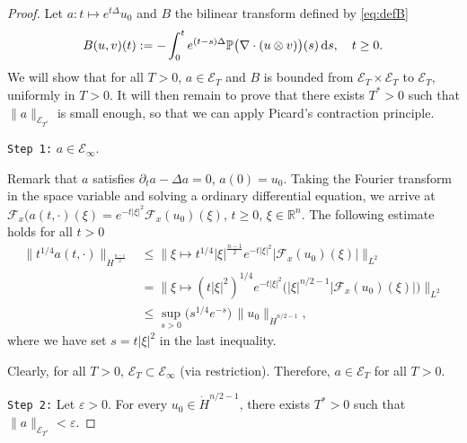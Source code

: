 \documentclass[a4paper, 12pt]{article}
\theoremstyle{plain}
\theoremstyle{definition}
\theoremstyle{remark}
\numberwithin{equation}{section}
\begin{document}
\begin{proof}
Let $a:t\mapsto e^{t\Delta}u_0$ and $B$ the bilinear transform defined by \eqref{eq:defB}
\[
B(u,v)(t):=-\int_0^t e^{(t-s)\Delta}{\mathbb{P}}\bigl(\nabla\cdot(u\otimes v)\bigr)(s)\,{\rm d}s,
\quad t\ge 0.
\]
We will show that for all $T>0$, $a\in {\mathscr{E}}_{T}$ and $B$ is bounded from
${\mathscr{E}}_{T}\times{\mathscr{E}}_{T}$ to ${\mathscr{E}}_{T}$, uniformly in $T>0$. 
It will then remain to prove that there exists $T^*>0$ such that $\|a\|_{{\mathscr{E}}_{T^*}}$
is small enough, so that we can apply Picard's contraction principle.

\medskip

\noindent
{\tt Step 1:} $a\in {\mathscr{E}}_{\infty}$. 

Remark that $a$ satisfies $\partial_t a-\Delta a=0$,
$a(0)=u_0$. Taking the Fourier transform in the space variable and solving a ordinary differential
equation, we arrive at ${\mathscr{F}}_x(a(t,\cdot)(\xi)=e^{-t|\xi|^2}{\mathscr{F}}_x(u_0)(\xi)$, $t\ge 0$, $\xi\in{\mathbb{R}}^n$. 
The following estimate holds for all $t>0$
%
\begin{align}
\label{eq:est_a}
\|t^{1/4}a(t,\cdot)\|_{\dot H^{\frac{n-1}{2}}}
&\le \|\xi\mapsto t^{1/4}|\xi|^{\frac{n-1}{2}}e^{-t|\xi|^2}|{\mathscr{F}}_x(u_0)(\xi)|\|_{L^2}
\nonumber\\
&=\bigl\|\xi\mapsto (t|\xi|^2)^{1/4}e^{-t|\xi|^2}\bigl(|\xi|^{n/2-1}|{\mathscr{F}}_x(u_0)(\xi)|\bigr)\bigr\|_{L^2}
\nonumber\\
&\le \sup_{s>0}\bigl(s^{1/4}e^{-s}\bigr)\,\|u_0\|_{\dot H^{n/2-1}},
\end{align}
%
where we have set $s=t|\xi|^2$ in the last inequality.

Clearly, for all $T>0$, ${\mathscr{E}}_T\subset {\mathscr{E}}_\infty$ (via restriction). Therefore,
$a\in{\mathscr{E}}_T$ for all $T>0$.

\medskip

\noindent
{\tt Step 2:}
Let $\varepsilon>0$. For every $u_0\in \dot H^{n/2-1}$, there exists $T^*>0$ such that 
$\|a\|_{{\mathscr{E}}_{T^*}}< \varepsilon$.


\end{proof}
\end{document}

